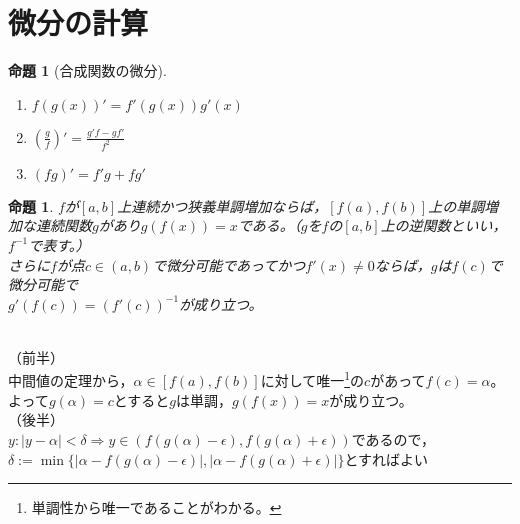 \documentclass[dvipdfmx,a4j,10pt]{jsarticle}
\makeatletter
\theoremstyle{mystyle1}
\newtheorem{prop}[dfn]{命題}
\theoremstyle{mystyle2}
\renewenvironment{proof}[1][\proofname]{\par
  \pushQED{\qed}%
  \normalfont
  \topsep6\p@\@plus6\p@ \trivlist
  \item[\hskip\labelsep{\bfseries\sffamily #1}]\ignorespaces
}{%
  \popQED\endtrivlist\@endpefalse
}
\renewcommand\proofname{証明}
\makeatother
\begin{document}
\newpage

\section{微分の計算}

\begin{framed}
    \begin{prop}[合成関数の微分]\label{prop7.1}\
        \vspace{-\baselineskip}
        \begin{enumerate}
        \item $f(g(x))'=f'(g(x))g'(x)$
        \item $\displaystyle \left(\frac{g}{f}\right)'=\frac{g'f-gf'}{f^2}$
        \item $(fg)'=f'g+fg'$
        \end{enumerate}
    \end{prop}
\end{framed}

\begin{framed}
    \begin{prop}\label{prop7.2}
    $f$が$[a,b]$上連続かつ狭義単調増加ならば，$[f(a),f(b)]$上の単調増加な連続関数$g$があり$g(f(x))=x$である。（$g$を$f$の$[a,b]$上の逆関数といい，$f^{-1}$で表す。）\\
    さらに$f$が点$c\in (a,b)$で微分可能であってかつ$f'(x)\neq0$ならば，$g$は$f(c)$で微分可能で\\$g'(f(c))=(f'(c))^{-1}$が成り立つ。
    \end{prop}
\end{framed}

\begin{proof}[命題\ref{prop7.2}の証明]\
    \\
    （前半）\\
    中間値の定理から，$\alpha\in [f(a),f(b)]$に対して唯一\footnote{単調性から唯一であることがわかる。}の$c$があって$f(c)=\alpha$。よって$g(\alpha)=c$とすると$g$は単調，$g(f(x))=x$が成り立つ。\\
    （後半）\\
    $y:|y-\alpha|<\delta\Rightarrow y\in (f(g(\alpha)-\epsilon),f(g(\alpha)+\epsilon))$であるので，$\delta :=\min\{|\alpha-f(g(\alpha)-\epsilon)|,|\alpha-f(g(\alpha)+\epsilon)|\}$とすればよい
\end{proof}
\end{document}
